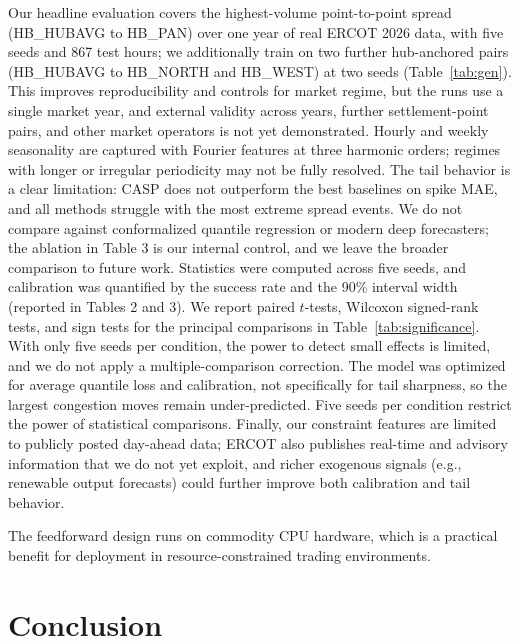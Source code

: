 \documentclass{article}
\begin{document}
Our headline evaluation covers the highest-volume point-to-point spread (HB\_HUBAVG to HB\_PAN) over one year of real ERCOT 2026 data, with five seeds and 867 test hours; we additionally train on two further hub-anchored pairs (HB\_HUBAVG to HB\_NORTH and HB\_WEST) at two seeds (Table~\ref{tab:gen}). This improves reproducibility and controls for market regime, but the runs use a single market year, and external validity across years, further settlement-point pairs, and other market operators is not yet demonstrated. Hourly and weekly seasonality are captured with Fourier features at three harmonic orders; regimes with longer or irregular periodicity may not be fully resolved. The tail behavior is a clear limitation: CASP does not outperform the best baselines on spike MAE, and all methods struggle with the most extreme spread events. We do not compare against conformalized quantile regression or modern deep forecasters; the ablation in Table 3 is our internal control, and we leave the broader comparison to future work. Statistics were computed across five seeds, and calibration was quantified by the success rate and the 90\% interval width (reported in Tables 2 and 3). We report paired $t$-tests, Wilcoxon signed-rank tests, and sign tests for the principal comparisons in Table~\ref{tab:significance}. With only five seeds per condition, the power to detect small effects is limited, and we do not apply a multiple-comparison correction. The model was optimized for average quantile loss and calibration, not specifically for tail sharpness, so the largest congestion moves remain under-predicted. Five seeds per condition restrict the power of statistical comparisons. Finally, our constraint features are limited to publicly posted day-ahead data; ERCOT also publishes real-time and advisory information that we do not yet exploit, and richer exogenous signals (e.g., renewable output forecasts) could further improve both calibration and tail behavior.

The feedforward design runs on commodity CPU hardware, which is a practical benefit for deployment in resource-constrained trading environments.

\section{Conclusion}
\label{sec:conclusion}
\end{document}
